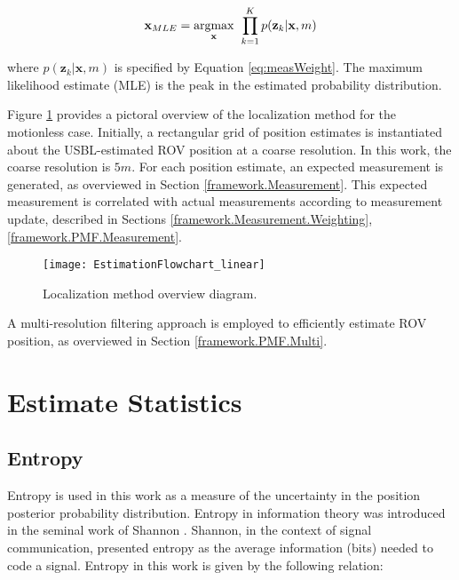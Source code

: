 \begin{equation}
\mathbf{x}_{MLE} = \underset{\mathbf{x}}{\text{argmax}} \hspace{1ex} \prod_{k=1}^{K} p(\mathbf{z}_k | \mathbf{x}, m)
\label{eq:ML}
\end{equation}

\noindent where $p(\mathbf{z}_k | \mathbf{x}, m)$ is specified by Equation \ref{eq:measWeight}. 
The maximum likelihood estimate (MLE) is the peak in the estimated probability distribution.

Figure \ref{fig:estDiagram} provides a pictoral overview of the localization method for the motionless case.   
Initially, a rectangular grid of position estimates is instantiated about the USBL-estimated ROV position at a coarse resolution.  
In this work, the coarse resolution is $5m$.
For each position estimate, an expected measurement is generated, as overviewed in Section \ref{framework.Measurement}.
This expected measurement is correlated with actual measurements according to measurement update, described in Sections \ref{framework.Measurement.Weighting}, \ref{framework.PMF.Measurement}.

\begin{figure}[!h]
	\centering
		\texttt{[image: EstimationFlowchart\_linear]}
	\caption{Localization method overview diagram. }
	\label{fig:estDiagram}
\end{figure}

A multi-resolution filtering approach is employed to efficiently estimate ROV position, as overviewed in Section \ref{framework.PMF.Multi}. 

\section{Estimate Statistics}
\label{framework.Statistics}

\subsection{Entropy}
\label{framework.Statistics.Entropy}

Entropy is used in this work as a measure of the uncertainty in the position posterior probability distribution.
Entropy in information theory was introduced in the seminal work of Shannon \cite{shannon1948mathematical}.
Shannon, in the context of signal communication, presented entropy as the average information (bits) needed to code a signal.
Entropy in this work is given by the following relation:

